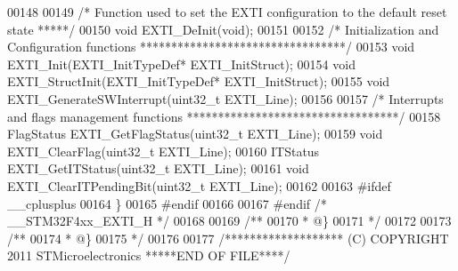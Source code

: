 \begin{DoxyCode}
00148 
00149 \textcolor{comment}{/*  Function used to set the EXTI configuration to the default reset state *****/}
00150 \textcolor{keywordtype}{void} EXTI_DeInit(\textcolor{keywordtype}{void});
00151 
00152 \textcolor{comment}{/* Initialization and Configuration functions *********************************/}
00153 \textcolor{keywordtype}{void} EXTI_Init(EXTI\_InitTypeDef* EXTI\_InitStruct);
00154 \textcolor{keywordtype}{void} EXTI_StructInit(EXTI\_InitTypeDef* EXTI\_InitStruct);
00155 \textcolor{keywordtype}{void} EXTI_GenerateSWInterrupt(uint32\_t EXTI\_Line);
00156 
00157 \textcolor{comment}{/* Interrupts and flags management functions **********************************/}
00158 FlagStatus EXTI_GetFlagStatus(uint32\_t EXTI\_Line);
00159 \textcolor{keywordtype}{void} EXTI_ClearFlag(uint32\_t EXTI\_Line);
00160 ITStatus EXTI_GetITStatus(uint32\_t EXTI\_Line);
00161 \textcolor{keywordtype}{void} EXTI_ClearITPendingBit(uint32\_t EXTI\_Line);
00162 
00163 \textcolor{preprocessor}{#}\textcolor{preprocessor}{ifdef} \_\_cplusplus
00164 \}
00165 \textcolor{preprocessor}{#}\textcolor{preprocessor}{endif}
00166 
00167 \textcolor{preprocessor}{#}\textcolor{preprocessor}{endif} \textcolor{comment}{/* \_\_STM32F4xx\_EXTI\_H */}
00168 
00169 \textcolor{comment}{/**}
00170 \textcolor{comment}{  * @\}}
00171 \textcolor{comment}{  */}
00172 
00173 \textcolor{comment}{/**}
00174 \textcolor{comment}{  * @\}}
00175 \textcolor{comment}{  */}
00176 
00177 \textcolor{comment}{/******************* (C) COPYRIGHT 2011 STMicroelectronics *****END OF FILE****/}
\end{DoxyCode}

